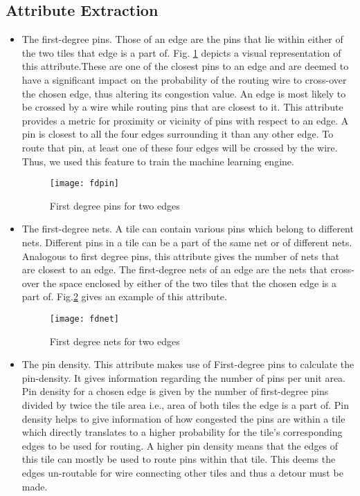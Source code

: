 \subsection{Attribute Extraction}
\begin{itemize}
\item The first-degree pins. Those of an edge are the pins that lie within either of the two tiles that edge is a part of. Fig. \ref{fig:fdpin} depicts a visual representation of this attribute.These are one of the closest pins to an edge and are deemed to have a significant impact on the probability of the routing wire to cross-over the chosen edge, thus altering its congestion value. An edge is most likely to be crossed by a wire while routing pins that are closest to it. This attribute provides a metric for proximity or vicinity of pins with respect to an edge. A pin is closest to all the four edges surrounding it than any other edge. To route that pin, at least one of these four edges will be crossed by the wire. Thus, we used this feature to train the machine learning engine.
\begin{figure}[htbp]
	\centerline{\texttt{[image: fdpin]}}
	\caption{First degree pins for two edges}
	\label{fig:fdpin}
\end{figure}

\item The first-degree nets. A tile can contain various pins which belong to different nets. Different pins in a tile can be a part of the same net or of different nets. Analogous to first degree pins, this attribute gives the number of nets that are closest to an edge. The first-degree nets of an edge are the nets that cross-over the space enclosed by either of the two tiles that the chosen edge is a part of. Fig.\ref{fig:fdnet}  gives an example of this attribute.
\begin{figure}[htbp]
	\centerline{\texttt{[image: fdnet]}}
	\caption{First degree nets for two edges}
	\label{fig:fdnet}
\end{figure}

\item The pin density. This attribute makes use of First-degree pins to calculate the pin-density. It gives information regarding the number of pins per unit area. Pin density for a chosen edge is given by the number of first-degree pins divided by twice the tile area i.e., area of both tiles the edge is a part of. Pin density helps to give information of how congested the pins are within a tile which directly translates to a higher probability for the tile's corresponding edges to be used for routing. A higher pin density means that the edges of this tile can mostly be used to route pins within that tile. This deems the edges un-routable for wire connecting other tiles and thus a detour must be made. 


\end{itemize}
